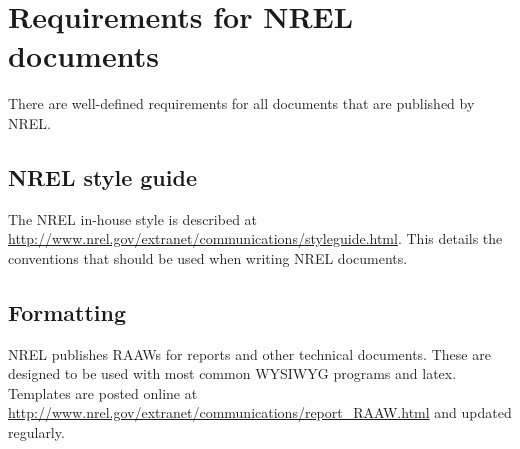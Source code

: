 \chapter{Requirements for NREL documents}

There are well-defined requirements for all documents that are published by NREL. 

\section{NREL style guide}
The NREL in-house style is described at \href{http://www.nrel.gov/extranet/communications/styleguide.html}{http://www.nrel.gov/extranet/communications/styleguide.html}. This details the conventions that should be used when writing NREL documents.

\section{Formatting}
NREL publishes RAAWs for reports and other technical documents. These are designed to be used with most common WYSIWYG programs and latex. Templates are posted online at \href{http://www.nrel.gov/extranet/communications/report\_RAAW.html}{http://www.nrel.gov/extranet/communications/report\_RAAW.html} and updated regularly. 
